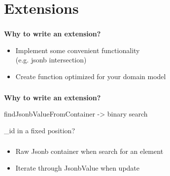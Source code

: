 \documentclass[usenames,dvipsnames, 18pt, compress, aspectratio=169]{beamer}
\begin{document}
\fontsize{13pt}{14}\selectfont
\section{Extensions}
\fontsize{17pt}{18}\selectfont

\begin{frame}
    \frametitle{}
    \begin{center}
        \textbf{Why to write an extension?}

        \vspace{1cm}
        \begin{itemize}[label={\MVRightarrow}]
            \item Implement some convenient functionality\\ (e.g. jsonb intersection)
            \item Create function optimized for your domain model
        \end{itemize}

    \end{center}
\end{frame}

\begin{frame}
    \frametitle{}
    \begin{center}
        \textbf{Why to write an extension?}

        \vspace{1cm}
        \begin{flushleft}
            findJsonbValueFromContainer -> binary search

            \_id in a fixed position?
        \end{flushleft}

    \end{center}
\end{frame}

\begin{frame}
    \frametitle{}
    \begin{center}

        \begin{itemize}[label={\MVRightarrow}]
            \item Raw Jsonb container when search for an element
            \item Iterate through JsonbValue when update
        \end{itemize}

    \end{center}
\end{frame}
\end{document}
